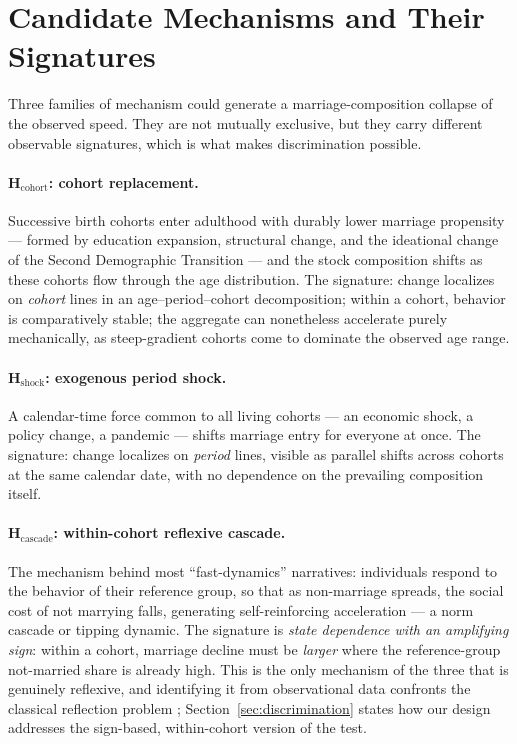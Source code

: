 \section{Candidate Mechanisms and Their Signatures}
\label{sec:mechanisms}

Three families of mechanism could generate a marriage-composition collapse of
the observed speed. They are not mutually exclusive, but they carry different
observable signatures, which is what makes discrimination possible.

\paragraph{H$_{\text{cohort}}$: cohort replacement.}
Successive birth cohorts enter adulthood with durably lower marriage propensity
--- formed by education expansion, structural change, and the ideational change
of the Second Demographic Transition \citep{callesvogl2026} --- and the stock
composition shifts as these
cohorts flow through the age distribution. The signature: change localizes on
\emph{cohort} lines in an age--period--cohort decomposition; within a cohort,
behavior is comparatively stable; the aggregate can nonetheless accelerate
purely mechanically, as steep-gradient cohorts come to dominate the observed
age range.

\paragraph{H$_{\text{shock}}$: exogenous period shock.}
A calendar-time force common to all living cohorts --- an economic shock, a
policy change, a pandemic --- shifts marriage entry for everyone at once. The
signature: change localizes on \emph{period} lines, visible as parallel shifts
across cohorts at the same calendar date, with no dependence on the prevailing
composition itself.

\paragraph{H$_{\text{cascade}}$: within-cohort reflexive cascade.}
The mechanism behind most ``fast-dynamics'' narratives: individuals respond to
the behavior of their reference group, so that as non-marriage spreads, the
social cost of not marrying falls, generating self-reinforcing acceleration ---
a norm cascade or tipping dynamic. The signature is \emph{state dependence with
an amplifying sign}: within a cohort, marriage decline must be \emph{larger}
where the reference-group not-married share is already high. This is the only
mechanism of the three that is genuinely reflexive, and identifying it from
observational data confronts the classical reflection problem
\citep{manski1993}; Section~\ref{sec:discrimination} states how our design
addresses the sign-based, within-cohort version of the test.

